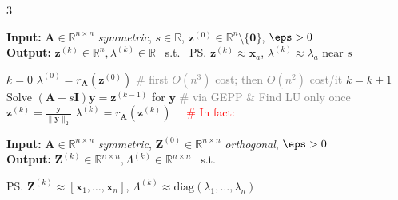 \documentclass{note}
\begin{document}
\begin{multicols}{3}
\begin{algorithm}[H]
\tiny
\caption*{\textbf{SII} \tiny Shifted Inverse Iteration \quad {} }
\textbf{Input:} $\mathbf{A} \in \mathbb{R}^{n \times n}$ \textit{symmetric}, $s \in \mathbb{R}$, $\mathbf{z}^{(0)} \in \mathbb{R}^n\setminus\{\mathbf{0}\}$, $\eps>0$ \\
\textbf{Output:} $\mathbf{z}^{(k)} \in \mathbb{R}^n, \lambda^{(k)} \in \mathbb{R}$ \ s.t. \ \ps{$\mathbf{z}^{(k)} \approx \mathbf{x}_a$, $\lambda^{(k)} \approx \lambda_a$ near $s$}
\begin{algorithmic}[1]
  \State $k = 0$
  \State $\lambda^{(0)} = r_{\mathbf{A}}(\mathbf{z}^{(0)})$ \quad \textcolor{gray}{\tiny \# first $O(n^3)$ cost; then $O(n^2)$ cost/it}
    \State $k = k + 1$
    \State Solve $(\mathbf{A} - s\mathbf{I}) \mathbf{y} = \mathbf{z}^{(k-1)}$ for $\mathbf{y}$ \quad \textcolor{gray}{\tiny \# via GEPP \& Find LU only once}
    \State $\mathbf{z}^{(k)} = \frac{\mathbf{y}}{\|\mathbf{y}\|_2}$
    \vspace{-1pt}
    \State $\lambda^{(k)} = r_{\mathbf{A}}(\mathbf{z}^{(k)})$ \ \ \textcolor{red}{\tiny \# In fact: }
    \vspace{-5pt}
  \EndWhile
\end{algorithmic}
\end{algorithm}


\begin{algorithm}[H]
\tiny
\caption*{\textbf{OI} Orthogonal Iteration \quad {}}
\textbf{Input:} $\mathbf{A} \in \mathbb{R}^{n \times n}$ \textit{symmetric}, $\mathbf{Z}^{(0)} \in \mathbb{R}^{n \times n}$ \textit{orthogonal}, $\eps>0$ \\
\textbf{Output:} $\mathbf{Z}^{(k)} \in \mathbb{R}^{n \times n}, \Lambda^{(k)} \in \mathbb{R}^{n \times n}$ \ s.t.

\qquad\qquad\ps{$\mathbf{Z}^{(k)} \approx [\mathbf{x}_1, \dots, \mathbf{x}_n]$, \quad $\Lambda^{(k)} \approx \mathrm{diag}(\lambda_1, \dots, \lambda_n)$}


\end{algorithm}
\end{multicols}
\end{document}
